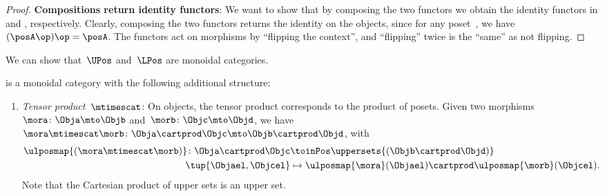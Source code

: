 \begin{proof}
    \textbf{Compositions return identity functors}:
    We want to show that by composing the two functors we obtain the identity functors in \UPos and \LPos, respectively.
    Clearly, composing the two functors returns the identity on the objects, since for any poset~\posA, we have~$(\posA\op)\op=\posA$.
    The functors act on morphisms by ``flipping the context'', and ``flipping'' twice is the ``same'' as not flipping.
\end{proof}

We can show that~$\UPos$ and~$\LPos$ are monoidal categories.

\begin{lemma}
    \label{lem:upos_moncat}
    \UPos is a monoidal category with the following additional structure:
    \begin{enumerate}
        \item \emph{Tensor product~$\mtimescat$}: On objects, the tensor product corresponds to the product of posets.
              Given two morphisms~$\mora\colon \Obja\mto \Objb$ and~$\morb\colon \Objc\mto \Objd$, we have~$\mora \mtimescat \morb\colon  \Obja \cartprod \Objc \mto \Objb\cartprod \Objd$, with
              \begin{equation}
                  \begin{aligned}
                      \ulposmap{(\mora\mtimescat \morb)}\colon \Obja \cartprod \Objc & \toinPos \uppersets{(\Objb\cartprod \Objd)} \\
                      \tup{\Objael,\Objcel}                                          & \mapsto \ulposmap{\mora}(\Objael)\cartprod \ulposmap{\morb}(\Objcel).
                  \end{aligned}
              \end{equation}
              Note that the Cartesian product of upper sets is an upper set.


\end{enumerate}
\end{lemma}
